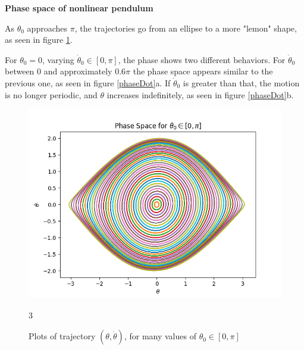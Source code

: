 \begin{problem}{1}
	\textbf{Phase space of nonlinear pendulum}

	As $\theta_{0}$ approaches $\pi$, the trajectories go from an ellipse to a more "lemon" shape, as seen in figure \ref{phase}.

	For $\theta_{0} = 0$, varying $\dot{\theta}_{0} \in [0,\pi]$, the phase shows two different behaviors.  For $\dot{\theta}_{0}$ between 0 and approximately $0.6\pi$ the phase space appears similar to the previous one, as seen in figure \ref{phaseDot}a.  If $\dot{\theta}_{0}$ is greater than that, the motion is no longer periodic, and $\theta$ increases indefinitely, as seen in figure \ref{phaseDot}b.

\begin{figure}[ht!]
	\centering
	\includegraphics[scale=0.6]{../figures/phaseSpace.png}
	\caption{Plots of trajectory $(\theta,\dot{\theta})$, for many values of $\theta_{0} \in [0,\pi]$}
	3\label{phase}
\end{figure}


\end{problem}
